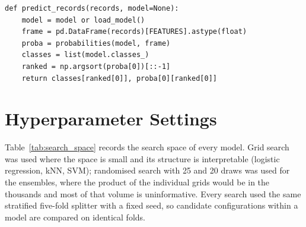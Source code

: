 \begin{lstlisting}[style=pycode, caption={Programmatic prediction. The saved
pipeline carries its own scaler, so callers never see raw feature scaling.},
label={lst:predict}]
def predict_records(records, model=None):
    model = model or load_model()
    frame = pd.DataFrame(records)[FEATURES].astype(float)
    proba = probabilities(model, frame)
    classes = list(model.classes_)
    ranked = np.argsort(proba[0])[::-1]
    return classes[ranked[0]], proba[0][ranked[0]]
\end{lstlisting}

\section{Hyperparameter Settings}

Table~\ref{tab:search_space} records the search space of every model. Grid search
was used where the space is small and its structure is interpretable (logistic
regression, kNN, SVM); randomised search with 25 and 20 draws was used for the
ensembles, where the product of the individual grids would be in the thousands and
most of that volume is uninformative. Every search used the same stratified
five-fold splitter with a fixed seed, so candidate configurations within a model
are compared on identical folds.

